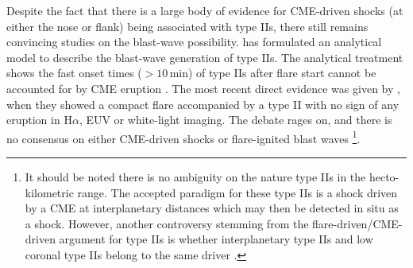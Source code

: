 Despite the fact that there is a large body of evidence for CME-driven shocks (at either the nose or flank) being associated with type IIs, there still remains convincing studies on the blast-wave possibility. \citet{vrsnak2000a,vrsnak2000b} has formulated an analytical model to describe the blast-wave generation of type IIs. The analytical treatment shows the fast onset times ($>10$\,min) of type IIs after flare start cannot be accounted for by CME eruption \citep{vrsnak2001}. The most recent direct evidence was given by \citet{mag2012}, when they showed a compact flare accompanied by a type II with no sign of any eruption in H$\alpha$, EUV or white-light imaging. The debate rages on, and there is no consensus on either CME-driven shocks or flare-ignited blast waves \citep{vrsnak2008} \footnote{It should be noted there is no ambiguity on the nature type IIs in the hecto-kilometric range. The accepted paradigm for these type IIs is a shock driven by a CME at interplanetary distances which may then be detected in situ as a shock. However, another controversy stemming from the flare-driven/CME-driven argument for type IIs is whether interplanetary type IIs and low coronal type IIs belong to the same driver \citep{cane2005}.}.



